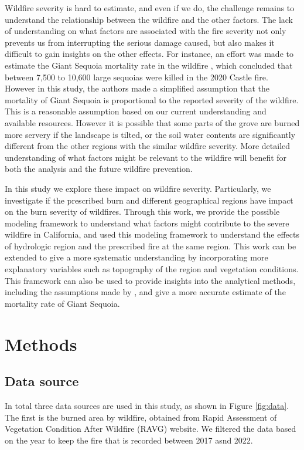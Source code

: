 \documentclass{article}
\begin{document}
Wildfire severity is hard to estimate, and even if we do, the challenge remains to understand the relationship between the wildfire and the other factors. 
The lack of understanding on what factors are associated with the fire severity not only prevents us from interrupting the serious damage caused, but also makes it difficult to gain insights on the other effects. For instance, an effort was made to estimate the Giant Sequoia mortality rate in the wildfire \cite{stephenson2021preliminary}, which concluded that between 7,500 to 10,600 large sequoias were killed in the 2020 Castle fire. However in this study, the authors made a simplified assumption that the mortality of Giant Sequoia is proportional to the reported severity of the wildfire. This is a reasonable assumption based on our current understanding and available resources. However it is possible that some parts of the grove are burned more servery if the landscape is tilted, or the soil water contents are significantly different from the other regions with the similar wildfire severity. More detailed understanding of what factors might be relevant to the wildfire will benefit for both the analysis and the future wildfire prevention. 



In this study we explore these impact on wildfire severity. Particularly, we investigate if the prescribed burn and different geographical regions have impact on the burn severity of wildfires. Through this work, we provide the possible modeling framework to understand what factors might contribute to the severe wildfire in California, and used this modeling framework to understand the effects of hydrologic region and the prescribed fire at the same region. This work can be extended to give a more systematic understanding by incorporating more explanatory variables such as topography of the region and vegetation conditions. This framework can also be used to provide insights into the analytical methods, including the assumptions made by \cite{stephenson2021preliminary}, and give a more accurate estimate of the mortality rate of Giant Sequoia. 


\section{Methods}
\subsection*{Data source}
In total three data sources are used in this study, as shown in Figure \ref{fig:data}. The first is the burned area by wildfire, obtained from Rapid Assessment of Vegetation Condition After Wildfire (RAVG) website. We filtered the data based on the year to keep the fire that is recorded between 2017 asnd 2022. 
\end{document}
